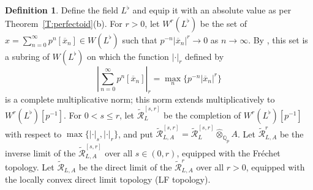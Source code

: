 \documentclass[12pt]{amsart}
\theoremstyle{definition}
\newtheorem{defn}[theorem]{Definition}
\numberwithin{equation}{theorem}
\newcommand{\QQ}{\mathbb{Q}}
\newcommand{\calR}{\mathcal{R}}
\begin{document}
\begin{defn}
Define the field $L^\flat$ and equip it with an absolute value as per
Theorem~\ref{T:perfectoid}(b). 
For $r>0$, let $W^r(L^\flat)$ be the set of $x = \sum_{n=0}^\infty p^n [\overline{x}_n] \in W(L^\flat)$ such that $p^{-n} \left| \overline{x}_n \right|^r \to 0$ as $n \to \infty$.
By \cite[Proposition~5.1.2]{kedlaya-liu1}, this set is a subring of $W(L^\flat)$ on which 
the function $\left| \cdot \right|_r$ defined by
\[
\left| \sum_{n=0}^\infty p^n [\overline{x}_n]  \right|_r = \max_n \{p^{-n} \left| \overline{x}_n \right|^r\}
\]
is a complete multiplicative norm; this norm extends multiplicatively to $W^r(L^\flat)[p^{-1}]$.
For $0 < s \leq r$, let $\tilde{\calR}^{[s,r]}_L$ be the completion of $W^r(L^\flat)[p^{-1}]$
with respect to $\max\{\left| \cdot \right|_s, \left| \cdot \right|_r\}$,
and put $\tilde{\calR}^{[s,r]}_{L,A} = \tilde{\calR}^{[s,r]}_L \widehat{\otimes}_{\QQ_p} A$.
Let $\tilde{\calR}^r_{L,A}$ be the inverse limit of the $\tilde{\calR}^{[s,r]}_{L,A}$ over all $s \in (0,r)$, equipped with the Fr\'echet topology. Let $\tilde{\calR}_{L,A}$ be the direct  limit of the $\tilde{\calR}^r_{L,A}$ over all $r>0$, equipped with the locally convex direct limit topology (LF topology).
\end{defn}
\end{document}
